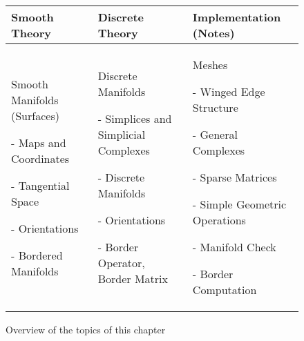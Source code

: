 \begin{figure}[ht]
\begin{center}
	\begin{longtable}{|p{4cm}|p{4cm}|p{4cm}|}
		\hline
		Smooth Theory& Discrete Theory& Implementation (Notes)\\
		\hline
		Smooth Manifolds (Surfaces)
		\begin{packed_itemize}
		\item[-] Maps and Coordinates
		\item[-] Tangential Space
		\item[-] Orientations
		\item[-] Bordered Manifolds
		\end{packed_itemize}
		&
		Discrete Manifolds
		\begin{packed_itemize}
		\item[-] Simplices and Simplicial Complexes
		\item[-] Discrete Manifolds
		\item[-] Orientations
		\item[-] Border Operator, Border Matrix
		\end{packed_itemize}
		&
		Meshes
		\begin{packed_itemize}
		\item[-] Winged Edge Structure
		\item[-] General Complexes
		\item[-] Sparse Matrices
		\item[-] Simple Geometric Operations
			\begin{packed_itemize}
				\item[-] Manifold Check
				\item[-] Border Computation
			\end{packed_itemize}
		\end{packed_itemize} \\
		\hline
	\end{longtable}
	\caption{Overview of the topics of this chapter}
\end{center}
\end{figure}


